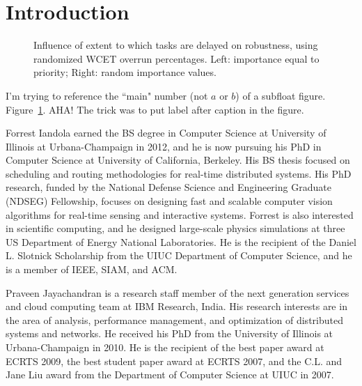 \documentclass[10pt,journal,letterpaper,compsoc, draftclsnofoot, onecolumn]{IEEEtran} %
\begin{document}
\maketitle
\IEEEdisplaynotcompsoctitleabstractindextext
\IEEEpeerreviewmaketitle

\section{Introduction}

\begin{figure}[htb]
  \centering
  \caption{Influence of extent to which tasks are delayed on robustness, using randomized WCET overrun percentages. Left: importance equal to priority; Right: random importance values.}
  \label{fig:delayAmtRandomized_doubleFigure}
\end{figure}

I'm trying to reference the ``main" number (not $a$ or $b$) of a subfloat figure.
Figure~\ref{fig:delayAmtRandomized_doubleFigure}.
AHA! The trick was to put label{} after caption{} in the figure.

\vspace{-.5in}
\begin{IEEEbiographynophoto}{Forrest Iandola}
earned the BS degree in Computer Science at University of Illinois at Urbana-Champaign in 2012, and he is now pursuing his PhD in Computer Science at University of California, Berkeley. 
His BS thesis focused on scheduling and routing methodologies for real-time distributed systems. 
His PhD research, funded by the National Defense Science and Engineering Graduate (NDSEG) Fellowship, focuses on designing fast and scalable computer vision algorithms for real-time sensing and interactive systems. 
Forrest is also interested in scientific computing, and he designed large-scale physics simulations at three US Department of Energy National Laboratories.
He is the recipient of the Daniel L. Slotnick Scholarship from the UIUC Department of Computer Science, and he is a member of IEEE, SIAM, and ACM.
\end{IEEEbiographynophoto}
\vspace{-.7in}
\begin{IEEEbiographynophoto}{Praveen Jayachandran}
is a research staff member of the next generation
services and cloud computing team at IBM Research, India. His research
interests are in the area of analysis, performance management, and
optimization of distributed systems and networks. He received his PhD from
the University of Illinois at Urbana-Champaign in 2010. He is the recipient
of the best paper award at ECRTS 2009, the best student paper award at
ECRTS 2007, and the C.L. and Jane Liu award from the Department of Computer
Science at UIUC in 2007.
\end{IEEEbiographynophoto}
\vspace{-.7in}
\end{document}
